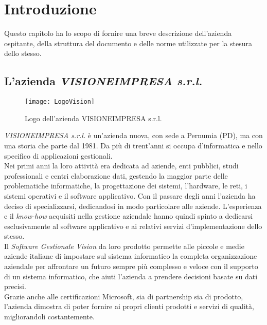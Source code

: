 
\chapter{Introduzione}
\label{cap:introduzione}
Questo capitolo ha lo scopo di fornire una breve descrizione dell'azienda ospitante, della struttura del documento e delle norme utilizzate per la stesura dello stesso.

\section{L'azienda \emph{VISIONEIMPRESA s.r.l.}}

\begin{figure}[!h] 
    \centering 
    \texttt{[image: LogoVision]} 
    \caption{Logo dell'azienda VISIONEIMPRESA s.r.l.}
\end{figure}

\emph{VISIONEIMPRESA s.r.l.} è un’azienda nuova, con sede a Pernumia (PD), ma con una storia che parte dal 1981. Da più di trent’anni si occupa d’informatica e nello specifico di applicazioni gestionali.\\
Nei primi anni la loro attività era dedicata ad aziende, enti pubblici, studi professionali e centri elaborazione dati, gestendo la maggior parte delle problematiche informatiche, la progettazione dei sistemi, l’hardware, le reti, i sistemi operativi e il software applicativo. Con il passare degli anni l’azienda ha deciso di specializzarsi, dedicandosi in modo particolare alle aziende. L’esperienza e il \textit{know-how} acquisiti nella gestione aziendale hanno quindi spinto a dedicarsi esclusivamente al software applicativo e ai relativi servizi d'implementazione dello stesso.\\
Il \textit{Software Gestionale Vision} da loro prodotto permette alle piccole e medie aziende italiane di impostare sul sistema informatico la completa organizzazione aziendale per affrontare un futuro sempre più complesso e veloce con il supporto di un sistema informatico, che aiuti l’azienda a prendere decisioni basate su dati precisi.\\
Grazie anche alle certificazioni Microsoft, sia di partnership sia di prodotto, l’azienda dimostra di poter fornire ai propri clienti prodotti e servizi di qualità, migliorandoli costantemente.

